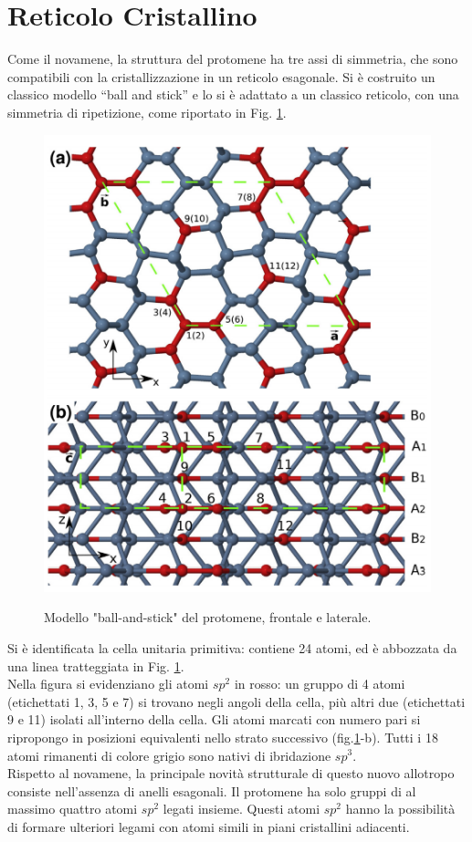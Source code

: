 \documentclass[a4paper,titlepage]{book}
\begin{document}
\section{Reticolo Cristallino}
Come il novamene, la struttura del protomene ha tre assi di simmetria, che sono compatibili con la cristallizzazione in un reticolo esagonale. Si è costruito un classico modello “ball and stick” e lo si è adattato a un classico reticolo, con una simmetria di ripetizione, come riportato in Fig. \ref{protocarbon}. \\
\begin{figure}[h!] 
	\centering \label{protocarbon}
	\includegraphics[width=0.75\columnwidth]{Protomene.png}
	\caption{ Modello "ball-and-stick" del protomene, frontale e laterale.}
\end{figure}
Si è identificata la cella unitaria primitiva: contiene 24 atomi, ed è abbozzata da una linea tratteggiata in Fig. \ref{protocarbon}.\\
Nella figura si evidenziano gli atomi $sp^2$ in rosso: un gruppo di 4 atomi (etichettati 1, 3, 5 e 7) si trovano negli angoli della cella, più altri due (etichettati 9 e 11) isolati all'interno della cella. Gli atomi marcati con numero pari si ripropongo in posizioni equivalenti nello strato successivo (fig.\ref{protocarbon}-b). Tutti i 18 atomi rimanenti di colore grigio sono nativi di ibridazione $sp^3$.\\

Rispetto al novamene, la principale novità strutturale di questo nuovo allotropo consiste nell'assenza di anelli esagonali. Il protomene ha solo gruppi di al massimo quattro atomi $sp^2$ legati insieme. Questi atomi $sp^2$ hanno la possibilità di formare ulteriori legami con atomi simili in piani cristallini adiacenti.
\end{document}
